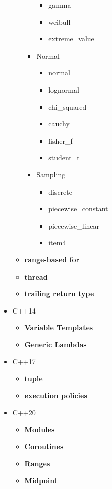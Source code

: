 \documentclass{article}
\begin{document}
\begin{itemize}
\begin{itemize}
\begin{itemize}
\begin{itemize}
						\item gamma
						\item weibull
						\item extreme\_value
					\end{itemize}
			      	\item Normal
					\begin{itemize}
						\item normal
						\item lognormal
						\item chi\_squared
						\item cauchy
						\item fisher\_f
						\item student\_t
					\end{itemize}
			      	\item Sampling
					\begin{itemize}
						\item discrete
						\item piecewise\_constant
						\item piecewise\_linear
						\item item4
					\end{itemize}
			      \end{itemize}
		      \item \textbf{range-based for}
		      \item \textbf{thread}
		      \item \textbf{trailing return type}
	      \end{itemize}
	\item C++14
	      \begin{itemize}
		      \item \textbf{Variable Templates}
		      \item \textbf{Generic Lambdas}
	      \end{itemize}
	\item C++17
	      \begin{itemize}
		      \item \textbf{tuple}
		      \item \textbf{execution policies}
	      \end{itemize}
	\item C++20
	      \begin{itemize}
		      \item \textbf{Modules}
		      \item \textbf{Coroutines}
		      \item \textbf{Ranges}
		      \item \textbf{Midpoint}

\end{itemize}
\end{itemize}
\end{document}
